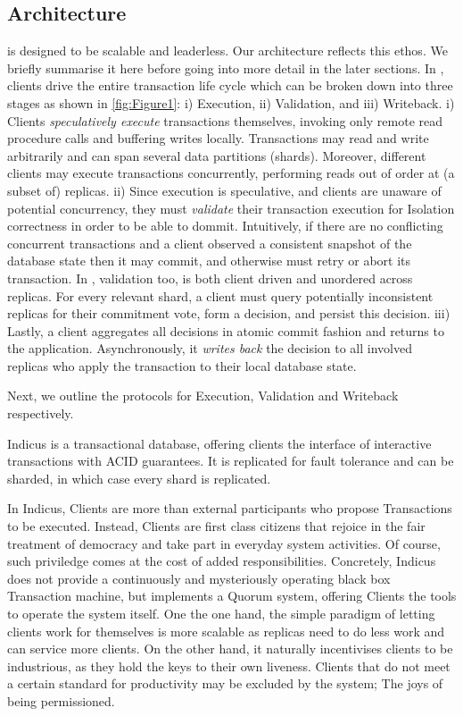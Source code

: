 \subsection{Architecture}
\sys is designed to be scalable and leaderless. Our architecture reflects this ethos. We briefly summarise it here before going into more detail in the later sections. 
In \sys, clients drive the entire transaction life cycle which can be broken down into three stages as shown in \ref{fig:Figure1}: i) Execution, ii) Validation, and iii) Writeback. 
i) Clients \textit{speculatively execute} transactions themselves, invoking only remote read procedure calls and buffering writes locally. Transactions may read and write arbitrarily and can span several data partitions (shards). Moreover, different clients may execute transactions concurrently, performing reads out of order at (a subset of) replicas. 
ii) Since execution is speculative, and clients are unaware of potential concurrency, they must \textit{validate} their transaction execution for Isolation correctness in order to be able to dommit. Intuitively, if there are no conflicting concurrent transactions and a client observed a consistent snapshot of the database state then it may commit, and otherwise must retry or abort its transaction. In \sys, validation too, is both client driven and unordered across replicas. For every relevant shard, a client must query potentially inconsistent replicas for their commitment vote, form a decision, and persist this decision. 
iii) Lastly, a client aggregates all decisions in atomic commit fashion and returns to the application. Asynchronously, it \textit{writes back} the decision to all involved replicas who apply the transaction to their local database state.

Next, we outline the protocols for Execution, Validation and Writeback respectively. 

Indicus is a transactional database, offering clients the interface of interactive transactions with ACID guarantees. It is replicated for fault tolerance and can be sharded, in which case every shard is replicated. 

In Indicus, Clients are more than external participants who propose Transactions to be executed. Instead, Clients are first class citizens that rejoice in the fair treatment of democracy and take part in everyday system activities. Of course, such priviledge comes at the cost of added responsibilities. Concretely, Indicus does not provide a continuously and mysteriously operating black box Transaction machine, but implements a Quorum system, offering Clients the tools to operate the system itself. One the one hand, the simple paradigm of letting clients work for themselves is more scalable as replicas need to do less work and can service more clients. On the other hand, it naturally incentivises clients to be industrious, as they hold the keys to their own liveness. Clients that do not meet a certain standard for productivity may be excluded by the system; The joys of being permissioned.

